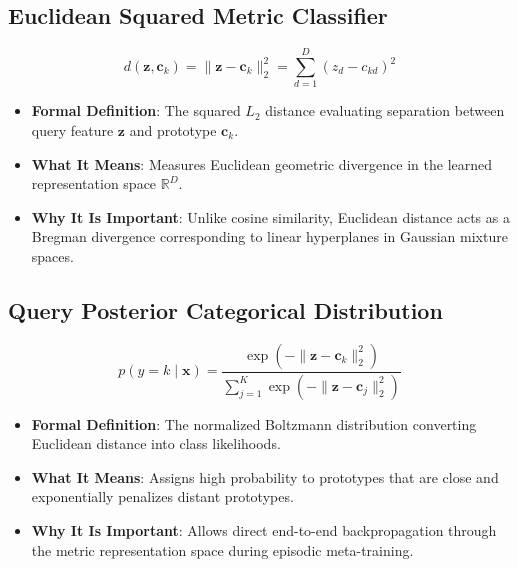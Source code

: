 \documentclass[11pt,a4paper]{article}
\theoremstyle{definition}
\begin{document}
\subsection{Euclidean Squared Metric Classifier}
{\boldmath
\begin{equation}
d(\mathbf{z}, \mathbf{c}_k) = \|\mathbf{z} - \mathbf{c}_k\|_2^2 = \sum_{d=1}^D (z_d - c_{kd})^2
\end{equation}
}
\begin{itemize}
    \item \textbf{Formal Definition}: The squared $L_2$ distance evaluating separation between query feature $\mathbf{z}$ and prototype $\mathbf{c}_k$.
    \item \textbf{What It Means}: Measures Euclidean geometric divergence in the learned representation space $\mathbb{R}^D$.
    \item \textbf{Why It Is Important}: Unlike cosine similarity, Euclidean distance acts as a Bregman divergence corresponding to linear hyperplanes in Gaussian mixture spaces.
\end{itemize}

\subsection{Query Posterior Categorical Distribution}
{\boldmath
\begin{equation}
p(y = k \mid \mathbf{x}) = \frac{\exp(-\|\mathbf{z} - \mathbf{c}_k\|_2^2)}{\sum_{j=1}^K \exp(-\|\mathbf{z} - \mathbf{c}_j\|_2^2)}
\end{equation}
}
\begin{itemize}
    \item \textbf{Formal Definition}: The normalized Boltzmann distribution converting Euclidean distance into class likelihoods.
    \item \textbf{What It Means}: Assigns high probability to prototypes that are close and exponentially penalizes distant prototypes.
    \item \textbf{Why It Is Important}: Allows direct end-to-end backpropagation through the metric representation space during episodic meta-training.
\end{itemize}
\end{document}
